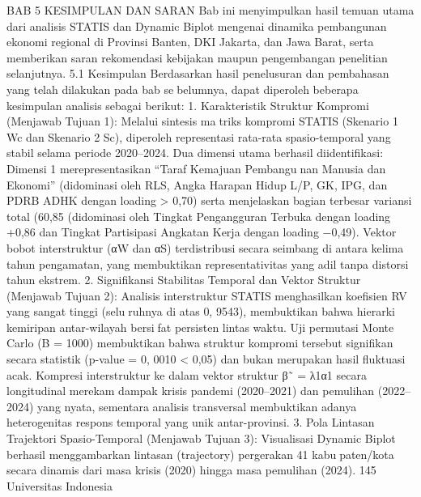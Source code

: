 BAB 5
KESIMPULAN DAN SARAN
Bab ini menyimpulkan hasil temuan utama dari analisis STATIS dan Dynamic Biplot
mengenai dinamika pembangunan ekonomi regional di Provinsi Banten, DKI Jakarta,
dan Jawa Barat, serta memberikan saran rekomendasi kebijakan maupun pengembangan
penelitian selanjutnya.
5.1 Kesimpulan
Berdasarkan hasil penelusuran dan pembahasan yang telah dilakukan pada bab sebelumnya, dapat diperoleh beberapa kesimpulan analisis sebagai berikut:
1. Karakteristik Struktur Kompromi (Menjawab Tujuan 1): Melalui sintesis matriks kompromi STATIS (Skenario 1 Wc dan Skenario 2 Sc), diperoleh representasi
rata-rata spasio-temporal yang stabil selama periode 2020–2024. Dua dimensi utama
berhasil diidentifikasi: Dimensi 1 merepresentasikan “Taraf Kemajuan Pembangunan Manusia dan Ekonomi” (didominasi oleh RLS, Angka Harapan Hidup L/P, GK,
IPG, dan PDRB ADHK dengan loading > 0,70) serta menjelaskan bagian terbesar
variansi total (60,85%
(didominasi oleh Tingkat Pengangguran Terbuka dengan loading +0,86 dan Tingkat
Partisipasi Angkatan Kerja dengan loading −0,49). Vektor bobot interstruktur (αW
dan αS) terdistribusi secara seimbang di antara kelima tahun pengamatan, yang
membuktikan representativitas yang adil tanpa distorsi tahun ekstrem.
2. Signifikansi Stabilitas Temporal dan Vektor Struktur (Menjawab Tujuan 2):
Analisis interstruktur STATIS menghasilkan koefisien RV yang sangat tinggi (seluruhnya di atas 0, 9543), membuktikan bahwa hierarki kemiripan antar-wilayah bersifat persisten lintas waktu. Uji permutasi Monte Carlo (B = 1000) membuktikan
bahwa struktur kompromi tersebut signifikan secara statistik (p-value = 0, 0010 <
0,05) dan bukan merupakan hasil fluktuasi acak. Kompresi interstruktur ke dalam
vektor struktur β˜ = λ1α1 secara longitudinal merekam dampak krisis pandemi
(2020–2021) dan pemulihan (2022–2024) yang nyata, sementara analisis transversal
membuktikan adanya heterogenitas respons temporal yang unik antar-provinsi.
3. Pola Lintasan Trajektori Spasio-Temporal (Menjawab Tujuan 3): Visualisasi
Dynamic Biplot berhasil menggambarkan lintasan (trajectory) pergerakan 41 kabupaten/kota secara dinamis dari masa krisis (2020) hingga masa pemulihan (2024).
145 Universitas Indonesia

